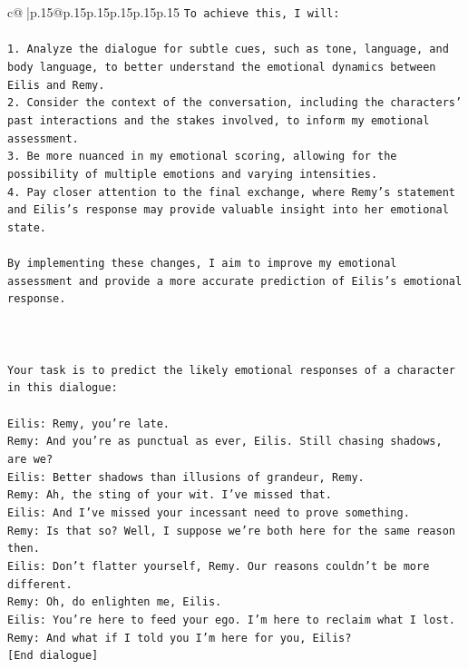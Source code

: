 \documentclass{article}
\begin{document}
{\begin{supertabular}{c@{$\;$}|p{.15\linewidth}@{}p{.15\linewidth}p{.15\linewidth}p{.15\linewidth}p{.15\linewidth}p{.15\linewidth}}
{{{\texttt{To achieve this, I will:} \\
\\ 
\texttt{1. Analyze the dialogue for subtle cues, such as tone, language, and body language, to better understand the emotional dynamics between Eilis and Remy.} \\
\texttt{2. Consider the context of the conversation, including the characters' past interactions and the stakes involved, to inform my emotional assessment.} \\
\texttt{3. Be more nuanced in my emotional scoring, allowing for the possibility of multiple emotions and varying intensities.} \\
\texttt{4. Pay closer attention to the final exchange, where Remy's statement and Eilis's response may provide valuable insight into her emotional state.} \\
\\ 
\texttt{By implementing these changes, I aim to improve my emotional assessment and provide a more accurate prediction of Eilis's emotional response.} \\
\\ 
\\ 
\\ 
\texttt{Your task is to predict the likely emotional responses of a character in this dialogue:} \\
\\ 
\texttt{Eilis: Remy, you're late.} \\
\texttt{Remy: And you're as punctual as ever, Eilis. Still chasing shadows, are we?} \\
\texttt{Eilis: Better shadows than illusions of grandeur, Remy.} \\
\texttt{Remy: Ah, the sting of your wit. I've missed that. } \\
\texttt{Eilis: And I've missed your incessant need to prove something.} \\
\texttt{Remy: Is that so? Well, I suppose we're both here for the same reason then.} \\
\texttt{Eilis: Don't flatter yourself, Remy. Our reasons couldn't be more different.} \\
\texttt{Remy: Oh, do enlighten me, Eilis. } \\
\texttt{Eilis: You're here to feed your ego. I'm here to reclaim what I lost.} \\
\texttt{Remy: And what if I told you I'm here for you, Eilis?} \\
\texttt{{[}End dialogue{]}} \\
}}}
\end{supertabular}}
\end{document}

